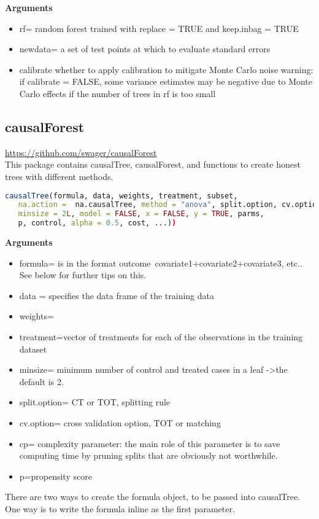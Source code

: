 \documentclass{article}
\begin{document}
\textbf{Arguments} \\
\begin{itemize}
  \item rf= random forest trained with replace = TRUE and keep.inbag = TRUE
  \item newdata= a set of test points at which to evaluate standard errors
  \item calibrate whether to apply calibration to mitigate Monte Carlo noise
	   warning: if calibrate = FALSE, some variance estimates may be negative
	   due to Monte Carlo effects if the number of trees in rf is too small
\end{itemize}

\subsection{causalForest} \url{https://github.com/swager/causalForest}\\
This package contains causalTree, causalForest, and functions to create honest trees with different methods. 

\begin{lstlisting}[language=R]
causalTree(formula, data, weights, treatment, subset, 
   na.action =  na.causalTree, method = "anova", split.option, cv.option, 
   minsize = 2L, model = FALSE, x = FALSE, y = TRUE, parms, 
   p, control, alpha = 0.5, cost, ...))	                                            	                           
\end{lstlisting}
\textbf{Arguments} \\
\begin{itemize}
 \item formula= is in the format 
		outcome~covariate1+covariate2+covariate3, etc.. See below for further tips on this. 
  \item data = specifies the data frame of the training data
  \item weights=
  \item treatment=vector of treatments for each of the observations in the training dataset
  \item minsize= minimum number of control and treated cases in a leaf ->the default is 2.
  \item split.option= CT or TOT, splitting rule
  \item cv.option= cross validation option, TOT or matching
  \item cp= complexity parameter: the main role of this parameter is to save computing time by pruning splits that are obviously not worthwhile. 
  \item p=propensity score
 \end{itemize}
There are two ways to create the formula object, to be passed into causalTree. One way is to write the formula inline as the first parameter. \\
\end{document}
